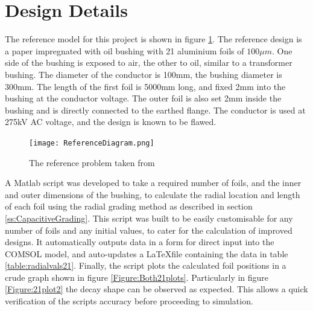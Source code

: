 \section{Design Details}
The reference model for this project is shown in figure \ref{figure:refproblem}. 
The reference design is a paper impregnated with oil bushing with 21 aluminium foils of $100\mu m$.
One side of the bushing is exposed to air, the other to oil, similar to a transformer bushing.
The diameter of the conductor is 100mm, the bushing diameter is 300mm.
The length of the first foil is 5000mm long, and fixed 2mm into the bushing at the conductor voltage.
The outer foil is also set 2mm inside the bushing and is directly connected to the earthed flange.
The conductor is used at 275kV AC voltage, and the design is known to be flawed.
\begin{figure}[!h]
   \centering
   \texttt{[image: ReferenceDiagram.png]}
   \caption{The reference problem taken from \cite{Chen14}}
   \label{figure:refproblem}
\end{figure}

A Matlab script was developed to take a required number of foils, and the inner and outer dimensions of the bushing, to calculate the radial location and length of each foil using the radial grading method as described in section \ref{ss:CapacitiveGrading}.
This script was built to be easily customisable for any number of foils and any initial values, to cater for the calculation of improved designs.
It automatically outputs data in a form for direct input into the COMSOL model, and auto-updates a \LaTeX  file containing the data in table \ref{table:radialvals21}.
Finally, the script plots the calculated foil positions in a crude graph shown in figure \ref{Figure:Both21plots}.
Particularly in figure \ref{Figure:21plot2} the decay shape can be observed as expected.
This allows a quick verification of the scripts accuracy before proceeding to simulation.



